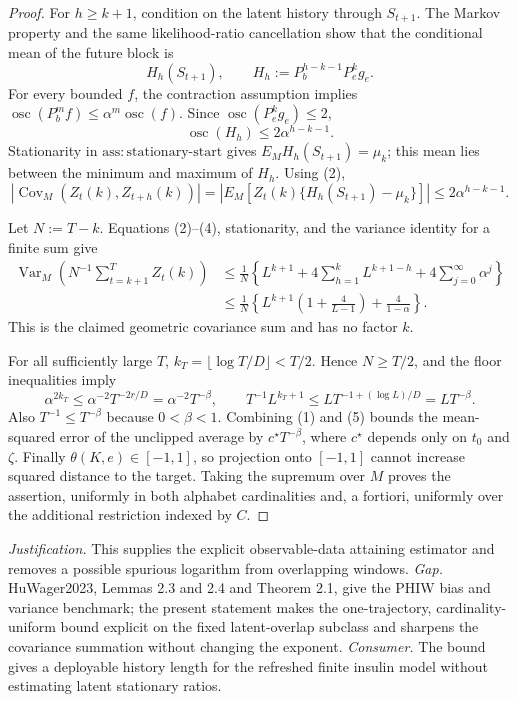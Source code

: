 \documentclass{article}
\begin{document}
\begin{proof}
For \(h\ge k+1\), condition on the latent history through \(S_{t+1}\).  The Markov property and the same likelihood-ratio cancellation show that the conditional mean of the future block is
\[
 H_h(S_{t+1}),\qquad
 H_h:=P_b^{h-k-1}P_e^kg_e.
\]
For every bounded \(f\), the contraction assumption implies
\(\operatorname{osc}(P_b^mf)\le\alpha^m\operatorname{osc}(f)\).  Since \(\operatorname{osc}(P_e^kg_e)\le2\),
\[
 \operatorname{osc}(H_h)\le2\alpha^{h-k-1}.
\]
Stationarity in \(\mathrm{ass{:}stationary\text{-}start}\) gives \(E_MH_h(S_{t+1})=\mu_k\); this mean lies between the minimum and maximum of \(H_h\).  Using (2),
\[
 |\operatorname{Cov}_M(Z_t(k),Z_{t+h}(k))|
 =|E_M[Z_t(k)\{H_h(S_{t+1})-\mu_k\}]|
 \le2\alpha^{h-k-1}. \tag{4}
\]

Let \(N:=T-k\).  Equations (2)--(4), stationarity, and the variance identity for a finite sum give
\[
 \begin{split}
 \operatorname{Var}_M\!\left(N^{-1}\sum_{t=k+1}^TZ_t(k)\right)
 &\le \frac1N\left\{L^{k+1}
       +4\sum_{h=1}^kL^{k+1-h}
       +4\sum_{j=0}^{\infty}\alpha^j\right\}\\
 &\le \frac1N\left\{L^{k+1}\left(1+\frac4{L-1}\right)
       +\frac4{1-\alpha}\right\}.
 \end{split}\tag{5}
\]
This is the claimed geometric covariance sum and has no factor \(k\).

For all sufficiently large \(T\), \(k_T=\lfloor\log T/D\rfloor<T/2\).  Hence \(N\ge T/2\), and the floor inequalities imply
\[
 \alpha^{2k_T}\le \alpha^{-2}T^{-2r/D}=\alpha^{-2}T^{-\beta},
 \qquad
 T^{-1}L^{k_T+1}\le L T^{-1+(\log L)/D}=LT^{-\beta}.
\]
Also \(T^{-1}\le T^{-\beta}\) because \(0<\beta<1\).  Combining (1) and (5) bounds the mean-squared error of the unclipped average by \(c^\star T^{-\beta}\), where \(c^\star\) depends only on \(t_0\) and \(\zeta\).  Finally \(\theta(K,e)\in[-1,1]\), so projection onto \([-1,1]\) cannot increase squared distance to the target.  Taking the supremum over \(M\) proves the assertion, uniformly in both alphabet cardinalities and, a fortiori, uniformly over the additional restriction indexed by \(C\).
\end{proof}
\par\smallskip\noindent \textit{Justification.} This supplies the explicit observable-data attaining estimator and removes a possible spurious logarithm from overlapping windows. \textit{Gap.} HuWager2023, Lemmas 2.3 and 2.4 and Theorem 2.1, give the PHIW bias and variance benchmark; the present statement makes the one-trajectory, cardinality-uniform bound explicit on the fixed latent-overlap subclass and sharpens the covariance summation without changing the exponent. \textit{Consumer.} The bound gives a deployable history length for the refreshed finite insulin model without estimating latent stationary ratios.
\end{document}

